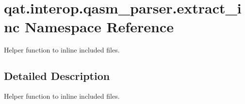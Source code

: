 \hypertarget{namespaceqat_1_1interop_1_1qasm__parser_1_1extract__inc}{\section{qat.\-interop.\-qasm\-\_\-parser.\-extract\-\_\-inc Namespace Reference}
\label{namespaceqat_1_1interop_1_1qasm__parser_1_1extract__inc}
}


Helper function to inline included files.  




\subsection{Detailed Description}
Helper function to inline included files. 